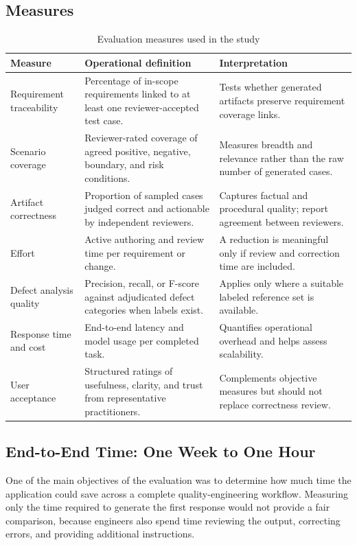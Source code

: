 \subsection{Measures}
\label{subsec:evaluation-measures}
\begin{table}[htbp]
\centering
\small
\begin{tabularx}{\textwidth}{p{}p{}X}
\toprule
\textbf{Measure} & \textbf{Operational definition} & \textbf{Interpretation} \\
\midrule
Requirement traceability & Percentage of in-scope requirements linked to at least one reviewer-accepted test case. & Tests whether generated artifacts preserve requirement coverage links. \\
Scenario coverage & Reviewer-rated coverage of agreed positive, negative, boundary, and risk conditions. & Measures breadth and relevance rather than the raw number of generated cases. \\
Artifact correctness & Proportion of sampled cases judged correct and actionable by independent reviewers. & Captures factual and procedural quality; report agreement between reviewers. \\
Effort & Active authoring and review time per requirement or change. & A reduction is meaningful only if review and correction time are included. \\
Defect analysis quality & Precision, recall, or F-score against adjudicated defect categories when labels exist. & Applies only where a suitable labeled reference set is available. \\
Response time and cost & End-to-end latency and model usage per completed task. & Quantifies operational overhead and helps assess scalability. \\
User acceptance & Structured ratings of usefulness, clarity, and trust from representative practitioners. & Complements objective measures but should not replace correctness review. \\
\bottomrule
\end{tabularx}
\caption{Evaluation measures used in the study}
\label{tab:evaluation-metrics}
\end{table}

\subsection{End-to-End Time: One Week to One Hour}
One of the main objectives of the evaluation was to determine how much time the application could save across a complete quality-engineering workflow. Measuring only the time required to generate the first response would not provide a fair comparison, because engineers also spend time reviewing the output, correcting errors, and providing additional instructions.


